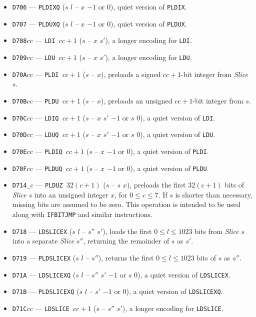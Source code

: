 \documentclass[12pt,oneside]{article}
\begin{document}
\begin{itemize}
\item {\tt D706} --- {\tt PLDIXQ} ($s$ $l$ -- $x$ $-1$ or $0$), quiet version of {\tt PLDIX}.
\item {\tt D707} --- {\tt PLDUXQ} ($s$ $l$ -- $x$ $-1$ or $0$), quiet version of {\tt PLDUX}.
\item {\tt D708$cc$} --- {\tt LDI $cc+1$} ($s$ -- $x$ $s'$), a longer encoding for {\tt LDI}.
\item {\tt D709$cc$} --- {\tt LDU $cc+1$} ($s$ -- $x$ $s'$), a longer encoding for {\tt LDU}.
\item {\tt D70A$cc$} --- {\tt PLDI $cc+1$} ($s$ -- $x$), preloads a signed $cc+1$-bit integer from {\em Slice\/} $s$.
\item {\tt D70B$cc$} --- {\tt PLDU $cc+1$} ($s$ -- $x$), preloads an unsigned $cc+1$-bit integer from $s$.
\item {\tt D70C$cc$} --- {\tt LDIQ $cc+1$} ($s$ -- $x$ $s'$ $-1$ or $s$ $0$), a quiet version of {\tt LDI}.
\item {\tt D70D$cc$} --- {\tt LDUQ $cc+1$} ($s$ -- $x$ $s'$ $-1$ or $s$ $0$), a quiet version of {\tt LDU}.
\item {\tt D70E$cc$} --- {\tt PLDIQ $cc+1$} ($s$ -- $x$ $-1$ or $0$), a quiet version of {\tt PLDI}.
\item {\tt D70F$cc$} --- {\tt PLDUQ $cc+1$} ($s$ -- $x$ $-1$ or $0$), a quiet version of {\tt PLDU}.
\item {\tt D714\_$c$} --- {\tt PLDUZ $32(c+1)$} ($s$ -- $s$ $x$), preloads the first $32(c+1)$ bits of {\em Slice\/} $s$ into an unsigned integer $x$, for $0\leq c\leq 7$. If $s$ is shorter than necessary, missing bits are assumed to be zero. This operation is intended to be used along with {\tt IFBITJMP} and similar instructions.
\item {\tt D718} --- {\tt LDSLICEX} ($s$ $l$ -- $s''$ $s'$), loads the first $0\leq l\leq 1023$ bits from {\em Slice\/} $s$ into a separate {\em Slice\/} $s''$, returning the remainder of $s$ as $s'$.
\item {\tt D719} --- {\tt PLDSLICEX} ($s$ $l$ -- $s''$), returns the first $0\leq l\leq 1023$ bits of $s$ as $s''$.
\item {\tt D71A} --- {\tt LDSLICEXQ} ($s$ $l$ -- $s''$ $s'$ $-1$ or $s$ $0$), a quiet version of {\tt LDSLICEX}.
\item {\tt D71B} --- {\tt PLDSLICEXQ} ($s$ $l$ -- $s'$ $-1$ or $0$), a quiet version of {\tt LDSLICEXQ}.
\item {\tt D71C$cc$} --- {\tt LDSLICE $cc+1$} ($s$ -- $s''$ $s'$), a longer encoding for {\tt LDSLICE}.

\end{itemize}
\end{document}
